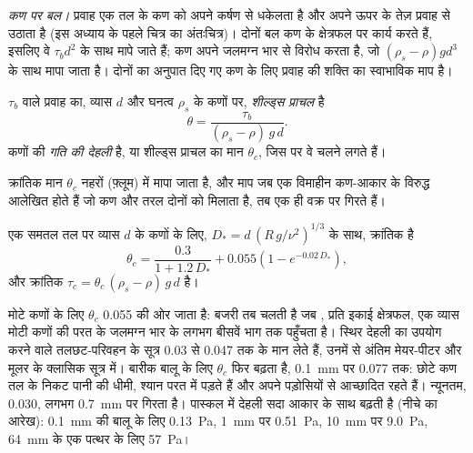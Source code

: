 \emph{कण पर बल।} प्रवाह एक तल के कण को अपने कर्षण से धकेलता है और अपने ऊपर के तेज़ प्रवाह से उठाता है (इस अध्याय के पहले चित्र का अंतःचित्र)। दोनों बल कण के क्षेत्रफल पर कार्य करते हैं, इसलिए वे $\tau_b
d^2$ के साथ मापे जाते हैं; कण अपने जलमग्न भार से विरोध करता है, जो $(\rho_s - \rho) g d^3$ के साथ मापा जाता है। दोनों का अनुपात दिए गए कण के लिए प्रवाह की शक्ति का स्वाभाविक माप है।

\begin{definition}[शील्ड्स प्राचल, गति की देहली]\label{def:b1:erosion-transport:threshold}
 $\tau_b$ वाले प्रवाह का, व्यास $d$ और घनत्व $\rho_s$ के कणों पर, \emph{शील्ड्स प्राचल} है
\[
  \theta = \frac{\tau_b}{(\rho_s - \rho)\,g\,d}.
\]
कणों की \emph{गति की देहली}  है, या शील्ड्स प्राचल का मान $\theta_c$, जिस पर वे चलने लगते हैं।
\end{definition}

क्रांतिक मान $\theta_c$ नहरों (फ़्लूम) में मापा जाता है, और माप जब एक विमाहीन कण-आकार के विरुद्ध आलेखित होते हैं जो कण और तरल दोनों को मिलाता है, तब एक ही वक्र पर गिरते हैं।

\begin{proposition}[सॉल्सबी और व्हाइटहाउस का देहली-वक्र]\label{prop:b1:erosion-transport:soulsby}
एक समतल तल पर व्यास $d$ के कणों के लिए, $D_* = d\,\left(R\,g/\nu^2\right)^{1/3}$ के साथ, क्रांतिक  है
\[
  \theta_c = \frac{0.3}{1 + 1.2\,D_*} + 0.055\left(1 - e^{-0.02\,D_*}\right),
\]
और क्रांतिक  $\tau_c = \theta_c\,(\rho_s - \rho)\,g\,d$ है।
\end{proposition}
\admitted

मोटे कणों के लिए $\theta_c$ \num{0.055} की ओर जाता है: बजरी तब चलती है जब , प्रति इकाई क्षेत्रफल, एक व्यास मोटी कणों की परत के जलमग्न भार के लगभग बीसवें भाग तक पहुँचता है। स्थिर देहली का उपयोग करने वाले तलछट-परिवहन के सूत्र \num{0.03} से \num{0.047} तक के मान लेते हैं, उनमें से अंतिम मेयर-पीटर और मूलर के क्लासिक  सूत्र में। बारीक बालू के लिए $\theta_c$ फिर बढ़ता है, \qty{0.1}{mm} पर \num{0.077} तक: छोटे कण तल के निकट पानी की धीमी, श्यान परत में पड़ते हैं और अपने पड़ोसियों से आच्छादित रहते हैं। न्यूनतम, \num{0.030}, लगभग \qty{0.7}{mm} पर गिरता है। पास्कल में देहली सदा आकार के साथ बढ़ती है (नीचे का आरेख): \qty{0.1}{mm} की बालू के लिए \qty{0.13}{Pa}, \qty{1}{mm} पर \qty{0.51}{Pa}, \qty{10}{mm} पर \qty{9.0}{Pa}, \qty{64}{mm} के एक पत्थर के लिए \qty{57}{Pa}।

